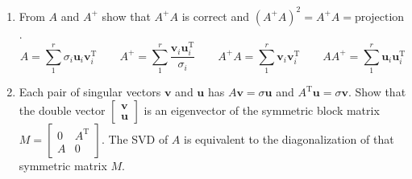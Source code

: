 \documentclass[14pt, a4paper]{article}
\begin{document}
\begin{enumerate}[resume]
    \item From $A$ and $A^+$ show that $A^+A$ is correct and $(A^+A)^2 = A^+A = \text{projection}$.
          \[
              A = \sum_1^r \sigma_i\boldsymbol{u}_i\boldsymbol{v}_i^{\mathrm{T}} \qquad A^+ = \sum_1^r \frac{\boldsymbol{v}_i\boldsymbol{u}_i^{\mathrm{T}}}{\sigma_i} \qquad A^+A = \sum_1^r \boldsymbol{v}_i\boldsymbol{v}_i^{\mathrm{T}} \qquad AA^+ = \sum_1^r \boldsymbol{u}_i\boldsymbol{u}_i^{\mathrm{T}}
          \]

    \item Each pair of singular vectors $\boldsymbol{v}$ and $\boldsymbol{u}$ has $A\boldsymbol{v} = \sigma\boldsymbol{u}$ and $A^{\mathrm{T}}\boldsymbol{u} = \sigma\boldsymbol{v}$. Show that the double vector $\begin{bmatrix} \boldsymbol{v} \\ \boldsymbol{u} \end{bmatrix}$ is an eigenvector of the symmetric block matrix $M = \begin{bmatrix} 0 & A^{\mathrm{T}} \\ A & 0 \end{bmatrix}$. The SVD of $A$ is equivalent to the diagonalization of that symmetric matrix $M$.
\end{enumerate}

\newpage
\end{document}
